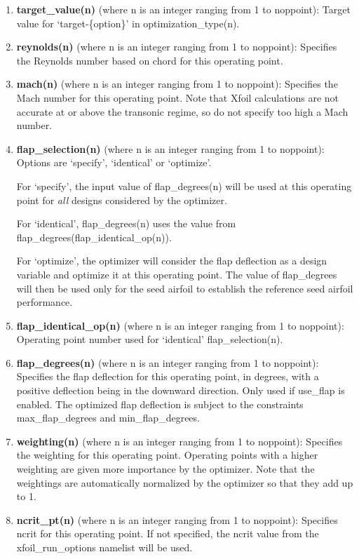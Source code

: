\documentclass[11pt]{article}
\begin{document}
\begin{enumerate}
\item{\textbf{target\_value(n)} (where n is an integer ranging from 1 to noppoint): Target value for `target-\{option\}' in optimization\_type(n).}

\item{\textbf{reynolds(n)} (where n is an integer ranging from 1 to noppoint): Specifies
	the Reynolds number based on chord for this operating point.}
\item{\textbf{mach(n)} (where n is an integer ranging from 1 to noppoint): Specifies
	the Mach number for this operating point.  Note that Xfoil calculations are not accurate
	at or above the transonic regime, so do not specify too high a Mach number.}

\item{\textbf{flap\_selection(n)} (where n is an integer ranging from 1 to noppoint):
	Options are `specify', `identical' or `optimize'.  
	
	For `specify', the input value of flap\_degrees(n)
	will be used at this operating point for \textit{all} designs considered by the optimizer.
	
	For `identical', flap\_degrees(n) uses the value from flap\_degrees(flap\_identical\_op(n)).
	
	For `optimize', the optimizer will consider the flap deflection as a design variable
	and optimize it at this operating point.  The value of flap\_degrees will then be used
	only for the seed airfoil to establish the reference seed airfoil performance.}
\item{\textbf{flap\_identical\_op(n)} (where n is an integer ranging from 1 to noppoint):
	Operating point number used for `identical' flap\_selection(n).}

\item{\textbf{flap\_degrees(n)} (where n is an integer ranging from 1 to noppoint):
	Specifies the flap deflection for this operating point, in degrees, with a positive
	deflection being in the downward direction. Only used if use\_flap is enabled. The
	optimized flap deflection is subject to the constraints max\_flap\_degrees and
	min\_flap\_degrees.}
\item{\textbf{weighting(n)} (where n is an integer ranging from 1 to noppoint): Specifies
	the weighting for this operating point.  Operating points with a higher weighting are
	given more importance by the optimizer.  Note that the weightings are automatically 
	normalized by the optimizer so that they add up to 1.}
\item{\textbf{ncrit\_pt(n)} (where n is an integer ranging from 1 to noppoint): Specifies
	ncrit for this operating point. If not specified, the ncrit value from the
	xfoil\_run\_options namelist will be used.}
\end{enumerate}
\end{document}
